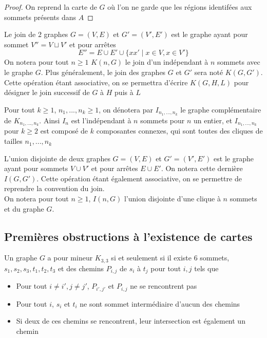 \documentclass{scrartcl}
\begin{document}
\begin{flushleft}
\begin{proof}
    On reprend la carte de $G$ où l'on ne garde que les régions identifées aux sommets présents dans $A$
\end{proof}

\begin{def*}[Join]
    Le join de $2$ graphes $G = (V, E)$ et $G' = (V', E')$ est le graphe ayant pour sommet $V'' = V \sqcup V'$ et pour arrêtes
    \[ E'' = E \cup E' \cup \{ xx' \mid x \in V, x \in V' \} \]
    On notera pour tout $n \geq 1$ $K(n, G)$ le join d'un indépendant à $n$ sommets avec le graphe $G$. Plus généralement,
    le join des graphes $G$ et $G'$ sera noté $K(G, G')$. Cette opération étant associative, on se permettra
    d'écrire $K(G, H, L)$ pour désigner le join successif de $G$ à $H$ puis à $L$
\end{def*}

\begin{def*}
    Pour tout $k \geq 1$, $n_1, ..., n_k \geq 1$, on dénotera par $I_{n_1, ..., n_k}$ le graphe complémentaire de $K_{n_1, ..., n_k}$.
    Ainsi $I_n$ est l'indépendant à $n$ sommets pour $n$ un entier, et $I_{n_1, ..., n_k}$ pour $k \geq 2$ est composé de $k$
    composantes connexes, qui sont toutes des cliques de tailles $n_1, ..., n_k$
\end{def*}

\begin{def*}
    L'union disjointe de deux graphes $G = (V, E)$ et $G' = (V', E')$ est le graphe ayant pour sommets $V \cup V'$ et pour arrêtes
    $E \cup E'$. On notera cette dernière $I(G, G')$. Cette opération étant également associative, on se permettre de reprendre la
    convention du join.\\
    On notera pour tout $n \geq 1$, $I(n, G)$ l'union disjointe d'une clique à $n$ sommets et du graphe $G$.
\end{def*}

\subsection{Premières obstructions à l'existence de cartes}

\begin{lem}\label{CNSK33}
    Un graphe $G$ a pour mineur $K_{3,3}$ si et seulement si il existe $6$ sommets, $s_1, s_2, s_3, t_1, t_2, t_3$ et des chemins
    $P_{i,j}$ de $s_i$ à $t_j$ pour tout $i, j$ tels que
    \begin{itemize}
        \item Pour tout $i \neq i', j \neq j'$, $P_{i',j'}$ et $P_{i, j}$ ne se rencontrent pas
        \item Pour tout $i$, $s_i$ et $t_i$ ne sont sommet intermédiaire d'aucun des chemins
        \item Si deux de ces chemins se rencontrent, leur intersection est également un chemin
    \end{itemize}
\end{lem}


\end{flushleft}
\end{document}
